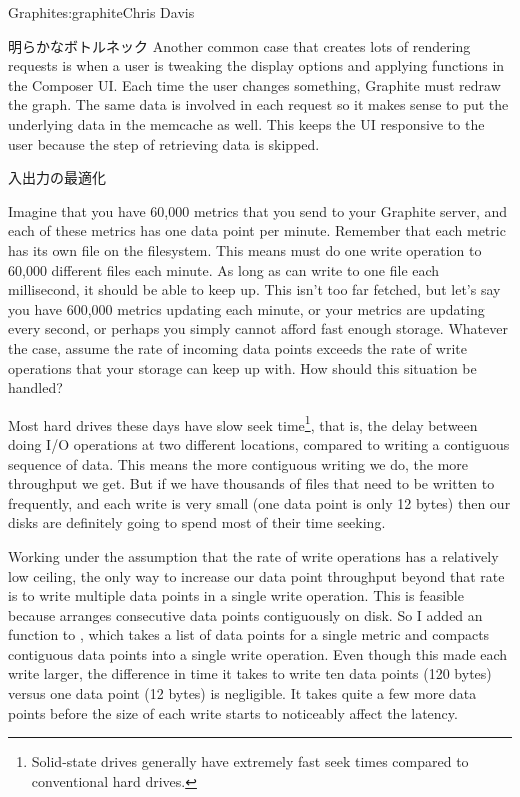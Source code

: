 \begin{aosachapter}{Graphite}{s:graphite}{Chris Davis}
\begin{aosasect1}{明らかなボトルネック}
Another common case that creates lots of rendering requests is when a
user is tweaking the display options and applying functions in the
Composer UI\@. Each time the user changes something, Graphite must
redraw the graph. The same data is involved in each request so it
makes sense to put the underlying data in the memcache as well.  This
keeps the UI responsive to the user because the step of retrieving
data is skipped.

\end{aosasect1}

\begin{aosasect1}{入出力の最適化}

Imagine that you have 60,000 metrics that you send to your Graphite
server, and each of these metrics has one data point per
minute. Remember that each metric has its own  file on the
filesystem. This means  must do one write operation to 60,000
different files each minute.  As long as  can write to one file
each millisecond, it should be able to keep up. This isn't too far
fetched, but let's say you have 600,000 metrics updating each minute,
or your metrics are updating every second, or perhaps you simply
cannot afford fast enough storage. Whatever the case, assume the rate
of incoming data points exceeds the rate of write operations that your
storage can keep up with. How should this situation be handled?

Most hard drives these days have slow seek time\footnote{Solid-state
drives generally have extremely fast seek times compared to
conventional hard drives.}, that is, the delay between doing I/O
operations at two different locations, compared to writing a
contiguous sequence of data. This means the more contiguous writing we
do, the more throughput we get. But if we have thousands of files that
need to be written to frequently, and each write is very small (one
 data point is only 12 bytes) then our disks are definitely
going to spend most of their time seeking.

Working under the assumption that the rate of write operations has a
relatively low ceiling, the only way to increase our data point
throughput beyond that rate is to write multiple data points in a
single write operation. This is feasible because  arranges
consecutive data points contiguously on disk. So I added an
 function to , which takes a list of data
points for a single metric and compacts contiguous data points into a
single write operation.  Even though this made each write larger, the
difference in time it takes to write ten data points (120 bytes)
versus one data point (12 bytes) is negligible. It takes quite a few
more data points before the size of each write starts to noticeably
affect the latency.


\end{aosasect1}
\end{aosachapter}
